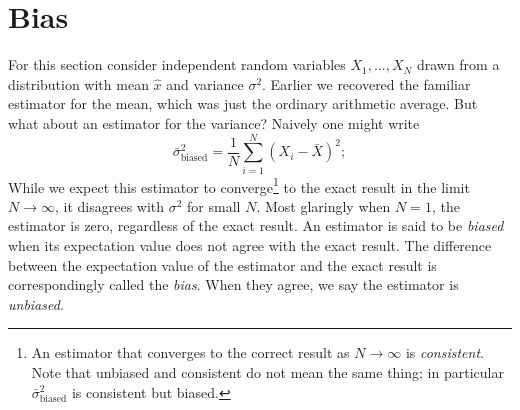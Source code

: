 \section{Bias}\label{sec:bias} 

For this section consider independent random variables $X_1,...,X_N$ 
drawn from a distribution with mean $\hat{x}$ and variance $\sigma^2$.
Earlier we recovered the familiar estimator for the mean, which was
just the ordinary arithmetic average. But what about an estimator for
the variance? Naively one might write
\begin{equation}\label{eq:bad}
  \bar{\sigma}^2_{\text{biased}}=\frac{1}{N}\sum_{i=1}^N(X_i-\bar{X})^2;
\end{equation} 
While we expect this estimator to converge\footnote{An estimator that
converges to the correct result as $N\to\infty$ is 
{\it consistent}. Note that unbiased and consistent
do not mean the same thing; in particular $\bar{\sigma}^2_{\text{biased}}$
is consistent but biased.} to the
exact result in the limit $N\to\infty$, it disagrees with
$\sigma^2$ for small $N$. Most glaringly when $N=1$, the
estimator is zero, regardless of the exact result. 
An estimator is said to be {\it biased} when its expectation value
does not agree with the exact result. The difference between the
expectation value of the estimator and the exact result is
correspondingly called the {\it bias}. When they agree, we say
the estimator is {\it unbiased}.
